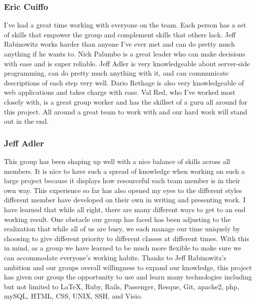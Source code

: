 \subsubsection{Eric Cuiffo} 
I've had a great time working with everyone on the team. Each person has a set of skills that empower the group and complement skills that others lack. Jeff Rabinowitz works harder than anyone I've ever met and can do pretty much anything if he wants to. Nick Palumbo is a great leader who can make decisions with ease and is super reliable. Jeff Adler is very knowledgeable about server-side programming, can do pretty much anything with it, and can communicate descriptions of each step very well. Dario Rethage is also very knowledgeable of web applications and takes charge with ease. Val Red, who I've worked most closely with, is a great group worker and has the skillset of a guru all around for this project. All around a great team to work with and our hard work will stand out in the end.\\

\subsubsection{Jeff Adler}
This group has been shaping up well with a nice balance of skills across all members. It is nice to have such a spread of knowledge when working on such a large project because it displays how resourceful each team member is in their own way. This experience so far has also opened my eyes to the different styles different member have developed on their own in writing and presenting work. I have learned that while all right, there are many different ways to get to an end working result. One obstacle our group has faced has been adjusting to the realization that while all of us are busy, we each manage our time uniquely by choosing to give different priority to different classes at different times. With this in mind, as a group we have learned to be much more flexible to make sure we can accommodate everyone's working habits. Thanks to Jeff Rabinowitz's ambition and our groups overall willingness to expand our knowledge, this project has given our group the opportunity to use and learn many technologies including but not limited to LaTeX, Ruby, Rails, Passenger, Resque, Git, apache2, php, mySQL, HTML, CSS, UNIX, SSH, and Visio. \\

